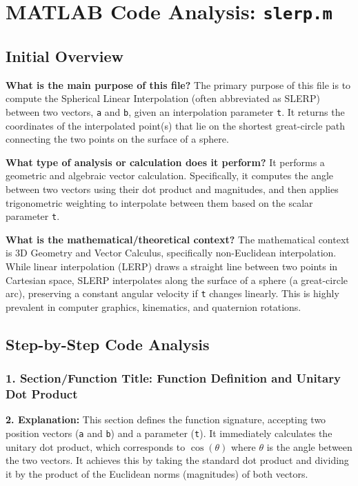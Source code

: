 
\chapter{MATLAB Code Analysis: \texttt{slerp.m}}
\date{}


\maketitle

\section{Initial Overview}

\textbf{What is the main purpose of this file?}
The primary purpose of this file is to compute the Spherical Linear Interpolation (often abbreviated as SLERP) between two vectors, \texttt{a} and \texttt{b}, given an interpolation parameter \texttt{t}. It returns the coordinates of the interpolated point(s) that lie on the shortest great-circle path connecting the two points on the surface of a sphere.

\textbf{What type of analysis or calculation does it perform?}
It performs a geometric and algebraic vector calculation. Specifically, it computes the angle between two vectors using their dot product and magnitudes, and then applies trigonometric weighting to interpolate between them based on the scalar parameter \texttt{t}.

\textbf{What is the mathematical/theoretical context?}
The mathematical context is 3D Geometry and Vector Calculus, specifically non-Euclidean interpolation. While linear interpolation (LERP) draws a straight line between two points in Cartesian space, SLERP interpolates along the surface of a sphere (a great-circle arc), preserving a constant angular velocity if \texttt{t} changes linearly. This is highly prevalent in computer graphics, kinematics, and quaternion rotations.

\section{Step-by-Step Code Analysis}

\subsection*{1. Section/Function Title: Function Definition and Unitary Dot Product}
\textbf{2. Explanation:} This section defines the function signature, accepting two position vectors (\texttt{a} and \texttt{b}) and a parameter (\texttt{t}). It immediately calculates the unitary dot product, which corresponds to $\cos(\theta)$ where $\theta$ is the angle between the two vectors. It achieves this by taking the standard dot product and dividing it by the product of the Euclidean norms (magnitudes) of both vectors.

